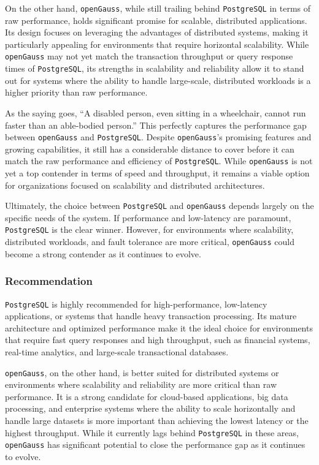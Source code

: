 \documentclass[12pt,a4paper,cs4size]{ctexart}
\begin{document}
On the other hand, \texttt{openGauss}, while still trailing behind \texttt{PostgreSQL} in terms of raw performance, holds significant promise for scalable, distributed applications. Its design focuses on leveraging the advantages of distributed systems, making it particularly appealing for environments that require horizontal scalability. While \texttt{openGauss} may not yet match the transaction throughput or query response times of \texttt{PostgreSQL}, its strengths in scalability and reliability allow it to stand out for systems where the ability to handle large-scale, distributed workloads is a higher priority than raw performance.

As the saying goes, ``A disabled person, even sitting in a wheelchair, cannot run faster than an able-bodied person.'' \cite{xiong2024} This perfectly captures the performance gap between \texttt{openGauss} and \texttt{PostgreSQL}. Despite \texttt{openGauss}'s promising features and growing capabilities, it still has a considerable distance to cover before it can match the raw performance and efficiency of \texttt{PostgreSQL}. While \texttt{openGauss} is not yet a top contender in terms of speed and throughput, it remains a viable option for organizations focused on scalability and distributed architectures. 

Ultimately, the choice between \texttt{PostgreSQL} and \texttt{openGauss} depends largely on the specific needs of the system. If performance and low-latency are paramount, \texttt{PostgreSQL} is the clear winner. However, for environments where scalability, distributed workloads, and fault tolerance are more critical, \texttt{openGauss} could become a strong contender as it continues to evolve.


\subsubsection*{Recommendation}

\texttt{PostgreSQL} is highly recommended for high-performance, low-latency applications, or systems that handle heavy transaction processing. Its mature architecture and optimized performance make it the ideal choice for environments that require fast query responses and high throughput, such as financial systems, real-time analytics, and large-scale transactional databases.

\texttt{openGauss}, on the other hand, is better suited for distributed systems or environments where scalability and reliability are more critical than raw performance. It is a strong candidate for cloud-based applications, big data processing, and enterprise systems where the ability to scale horizontally and handle large datasets is more important than achieving the lowest latency or the highest throughput. While it currently lags behind \texttt{PostgreSQL} in these areas, \texttt{openGauss} has significant potential to close the performance gap as it continues to evolve.
\end{document}

